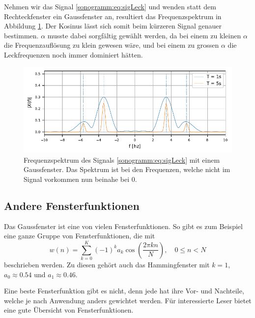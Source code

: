 Nehmen wir das Signal \eqref{sonogramm:eq:sigLeck} und wenden statt dem Rechteckfenster
ein Gaussfenster an, resultiert das Frequenzspektrum in Abbildung \ref{sonogramm:twoHarmGauss}.
Der Kosinus lässt sich somit beim kürzeren Signal genauer bestimmen.
$\alpha$ musste dabei sorgfältig gewählt werden, da bei einem zu kleinen $\alpha$ die 
Frequenzauflösung zu klein gewesen wäre, und bei einem zu grossen $\alpha$ die Leckfrequenzen
noch immer dominiert hätten.

\begin{figure}
    \centering
    \includegraphics{papers/sonogramm/images/twoHarmGauss.pdf}
    \caption{Frequenzspektrum des Signals \eqref{sonogramm:eq:sigLeck} mit
    einem Gaussfenster. Das Spektrum ist bei den Frequenzen, welche nicht im Signal vorkommen
    nun beinahe bei 0.
    \label{sonogramm:twoHarmGauss}
    }
\end{figure}

\subsection{Andere Fensterfunktionen}
Das Gaussfenster ist eine von vielen Fensterfunktionen. 
So gibt es zum Beispiel eine ganze Gruppe von Fensterfunktionen, die mit
\begin{equation}
    w(n) = \sum_{k=0}^{K} (-1)^k a_k \cos\left(\frac{2 \pi k n}{N}\right), \quad 0 \leq n < N
\end{equation}
beschrieben werden.
Zu diesen gehört auch das Hammingfenster mit $k = 1$, $a_0 \approx 0.54$ und $a_1 \approx 0.46$.

Eine beste Fensterfunktion gibt es nicht, denn jede hat ihre Vor- und Nachteile, welche
je nach Anwendung anders gewichtet werden.
Für interessierte Leser bietet \cite{sonogramm:wikiWin} eine 
gute Übersicht von Fensterfunktionen.

